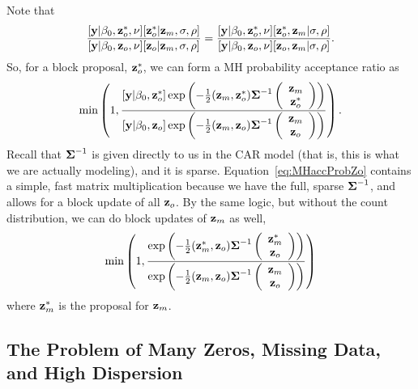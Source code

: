 \documentclass[11pt, titlepage]{article}
\begin{document}
\begin{flushleft}
\begin{onehalfspace}
Note that    
\[
\frac{[\mathbf{y}|\beta_{0},\mathbf{z}^{*}_{o},\nu][\mathbf{z}^{*}_{o}|\mathbf{z}_{m},\sigma,\rho]}
	{[\mathbf{y}|\beta_{0},\mathbf{z}_{o},\nu][\mathbf{z}_{o}|\mathbf{z}_{m},\sigma,\rho]} =
  \frac{[\mathbf{y}|\beta_{0},\mathbf{z}^{*}_{o},\nu][\mathbf{z}^{*}_{o}, \mathbf{z}_{m}|\sigma,\rho]}
	{[\mathbf{y}|\beta_{0},\mathbf{z}_{o},\nu][\mathbf{z}_{o}, \mathbf{z}_{m} | \sigma,\rho]}.
\]
So, for a block proposal, $\mathbf{z}_{o}^{*}$, we can form a MH probability acceptance ratio as
\begin{equation} \label{eq:MHaccProbZo}
\min\left(1,\frac{[\mathbf{y}|\beta_{0},\mathbf{z}^{*}_{o}]\exp\left(-\frac{1}{2}
(\mathbf{z}_{m},\mathbf{z}_{o}^{*})\mbox{\boldmath $\Sigma$}^{-1} \left(
	\begin{array}{c}
		\mathbf{z}_{m} \\
		\mathbf{z}_{o}^{*}
	\end{array}
	\right)
\right)}{[\mathbf{y}|\beta_{0},\mathbf{z}_{o}]\exp\left(-\frac{1}{2}
(\mathbf{z}_{m},\mathbf{z}_{o})\mbox{\boldmath $\Sigma$}^{-1} \left(
	\begin{array}{c}
		\mathbf{z}_{m} \\
		\mathbf{z}_{o}
	\end{array}
	\right)
\right)}
\right).
\end{equation}
Recall that $\mbox{\boldmath $\Sigma$}^{-1}$ is given directly to us in the CAR model (that is, this is what we are actually modeling), and it is sparse. Equation~\eqref{eq:MHaccProbZo} contains a simple, fast matrix multiplication because we have the full, sparse $\mbox{\boldmath $\Sigma$}^{-1}$, and allows for a block update of all $\mathbf{z}_{o}$.  By the same logic, but without the count distribution, we can do block updates of $\mathbf{z}_{m}$ as well, 
\begin{equation} \label{eq:MHaccProbZm}
\min\left(1,\frac{\exp\left(-\frac{1}{2}
(\mathbf{z}_{m}^{*},\mathbf{z}_{o})\mbox{\boldmath $\Sigma$}^{-1} \left(
	\begin{array}{c}
		\mathbf{z}_{m}^{*} \\
		\mathbf{z}_{o}
	\end{array}
	\right)
\right)}{\exp\left(-\frac{1}{2}
(\mathbf{z}_{m},\mathbf{z}_{o})\mbox{\boldmath $\Sigma$}^{-1} \left(
	\begin{array}{c}
		\mathbf{z}_{m} \\
		\mathbf{z}_{o}
	\end{array}
	\right)
\right)}
\right)
\end{equation}
where $\mathbf{z}^{*}_{m}$ is the proposal for $\mathbf{z}_{m}$.


\subsection*{The Problem of Many Zeros, Missing Data, and High Dispersion}


\end{onehalfspace}
\end{flushleft}
\end{document}
